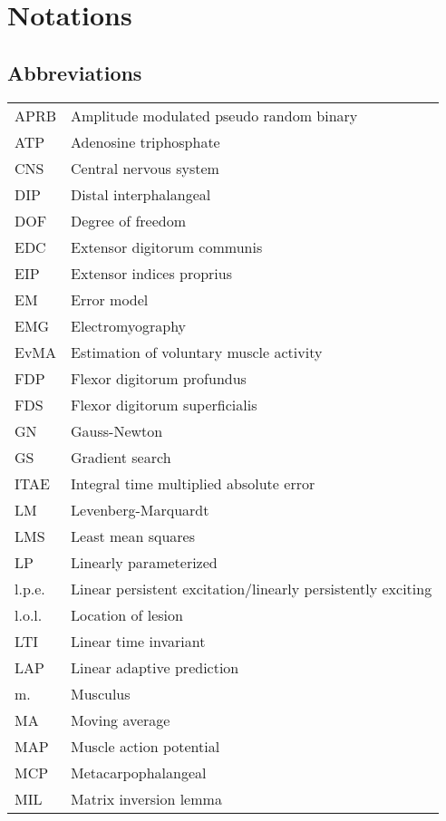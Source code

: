 \chapter*{Notations}

\manualmark
{}

\section*{Abbreviations}

\begin{longtable}[l]{ll}
APRB			& Amplitude modulated pseudo random binary\\
ATP				& Adenosine triphosphate\\
CNS				& Central nervous system\\
DIP				& Distal interphalangeal\\
DOF				& Degree of freedom\\		
EDC				& Extensor digitorum communis\\
EIP				& Extensor indices proprius\\
EM				& Error model \\
EMG				& Electromyography \\
EvMA			& Estimation of voluntary muscle activity \\
FDP				& Flexor digitorum profundus\\
FDS				& Flexor digitorum superficialis\\
GN 				& Gauss-Newton\\
GS 				& Gradient search\\
ITAE 			& Integral time multiplied absolute error\\
LM 				& Levenberg-Marquardt\\
LMS 			& Least mean squares\\
LP 				& Linearly parameterized\\
l.p.e.		& Linear persistent excitation/linearly persistently exciting\\
l.o.l.		& Location of lesion\\
LTI				& Linear time invariant \\
LAP				& Linear adaptive prediction \\
m.				& Musculus\\
MA				& Moving average\\
MAP				& Muscle action potential\\
MCP				& Metacarpophalangeal\\
MIL				& Matrix inversion lemma\\

\end{longtable}
